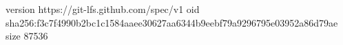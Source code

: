 version https://git-lfs.github.com/spec/v1
oid sha256:f3c7f4990b2bc1c1584aaee30627aa6344b9eebf79a9296795e03952a86d79ae
size 87536
